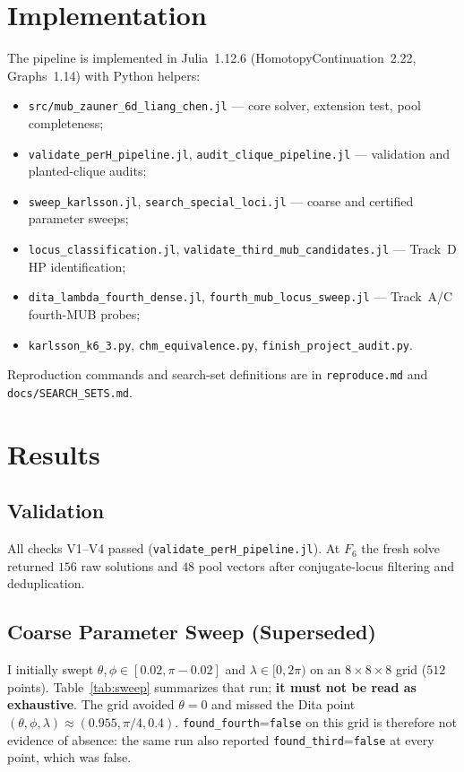 \documentclass[onecolumn]{IEEEtran}
\begin{document}
\section{Implementation}
\label{sec:impl}

The pipeline is implemented in Julia~1.12.6 (HomotopyContinuation~2.22, Graphs~1.14) with Python helpers:
\begin{itemize}
    \item \texttt{src/mub\_zauner\_6d\_liang\_chen.jl} --- core solver, extension test, pool completeness;
    \item \texttt{validate\_perH\_pipeline.jl}, \texttt{audit\_clique\_pipeline.jl} --- validation and planted-clique audits;
    \item \texttt{sweep\_karlsson.jl}, \texttt{search\_special\_loci.jl} --- coarse and certified parameter sweeps;
    \item \texttt{locus\_classification.jl}, \texttt{validate\_third\_mub\_candidates.jl} --- Track~D HP identification;
    \item \texttt{dita\_lambda\_fourth\_dense.jl}, \texttt{fourth\_mub\_locus\_sweep.jl} --- Track~A/C fourth-MUB probes;
    \item \texttt{karlsson\_k6\_3.py}, \texttt{chm\_equivalence.py}, \texttt{finish\_project\_audit.py}.
\end{itemize}
Reproduction commands and search-set definitions are in \texttt{reproduce.md} and \texttt{docs/SEARCH\_SETS.md}.

\section{Results}
\label{sec:results}

\subsection{Validation}
All checks V1--V4 passed (\texttt{validate\_perH\_pipeline.jl}).
At $F_6$ the fresh solve returned $156$ raw solutions and $48$ pool vectors after conjugate-locus filtering and deduplication.

\subsection{Coarse Parameter Sweep (Superseded)}
\label{sec:coarsesweep}
I initially swept $\theta,\phi\in[0.02,\pi-0.02]$ and $\lambda\in[0,2\pi)$ on an $8\times8\times8$ grid ($512$ points).
Table~\ref{tab:sweep} summarizes that run; \textbf{it must not be read as exhaustive}.
The grid avoided $\theta=0$ and missed the Dita point $(\theta,\phi,\lambda)\approx(0.955,\pi/4,0.4)$.
\texttt{found\_fourth}=\texttt{false} on this grid is therefore not evidence of absence: the same run also reported \texttt{found\_third}=\texttt{false} at every point, which was false.
\end{document}
